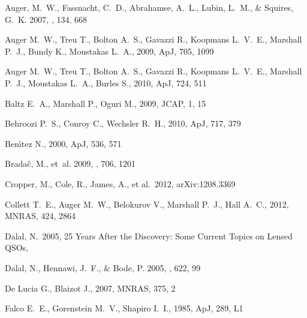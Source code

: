 \begin{thebibliography}{99}


{Auger}, M.~W., {Fassnacht}, C.~D., {Abrahamse}, A.~L., {Lubin}, L.~M., \&
  {Squires}, G.~K. 2007, \aj, 134, 668


Auger M.~W., Treu T., Bolton A.~S., Gavazzi R., Koopmans L.~V.~E., Marshall 
P.~J., Bundy K., Moustakas L.~A., 2009, ApJ, 705, 1099 


Auger M.~W., Treu T., Bolton A.~S., Gavazzi R., Koopmans L.~V.~E., Marshall 
P.~J., Moustakas L.~A., Burles S., 2010, ApJ, 724, 511 


 Baltz E.~A., Marshall P., Oguri M., 2009, JCAP, 1, 15 


 Behroozi P.~S., Conroy C., Wechsler R.~H., 2010, ApJ, 717, 379 


 Ben{\'{\i}}tez N., 2000, ApJ, 536, 571 


{Brada{\v c}}, M., {et~al.} 2009, \apj, 706, 1201

 Cropper, M., Cole, R., 
James, A., et al.\ 2012, arXiv:1208.3369 


 Collett T.~E., Auger M.~W., Belokurov V., 
Marshall P.~J., Hall A.~C., 2012, MNRAS, 424, 2864 


 Dalal, N.\ 2005, 25 Years After 
the Discovery: Some Current Topics on Lensed QSOs,  


{Dalal}, N., {Hennawi}, J.~F., \& {Bode}, P. 2005, \apj, 622, 99


 De Lucia G., Blaizot J., 2007, MNRAS, 375, 2 


 Falco E.~E., Gorenstein M.~V., Shapiro I.~I., 1985, ApJ, 289, L1 



\end{thebibliography}
